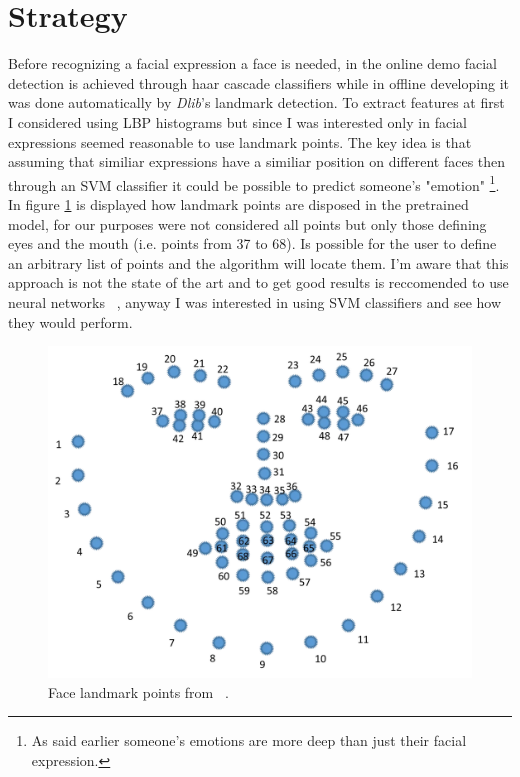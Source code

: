 \section{Strategy}
Before recognizing a facial expression a face is needed, in the online demo facial detection is achieved through haar cascade classifiers while in offline developing it was done automatically by \textit{Dlib}'s landmark detection.
To extract features at first I considered using LBP histograms but since I was interested only in facial expressions seemed reasonable to use landmark points. 
The key idea is that assuming that similiar expressions have a similiar position on different faces then through an SVM classifier it could be possible to predict someone's "emotion" \footnote{As said earlier someone's emotions are more deep than just their facial expression.}.
In figure \ref{fig:landmarks} is displayed how landmark points are disposed in the pretrained model, for our purposes were not considered all points but only those defining eyes and the mouth (i.e. points from 37 to 68).
Is possible for the user to define an arbitrary list of points and the algorithm will locate them.
I'm aware that this approach is not the state of the art and to get good results is reccomended to use neural networks ~\cite{blog:emotion}, anyway I was interested in using SVM classifiers and see how they would perform.

\begin{figure}[h!t]
    \centering
    \includegraphics[scale=0.2]{images/landmark.png}
    \caption{Face landmark points from ~\cite{landmark:guide}.}
    \label{fig:landmarks}
\end{figure}

